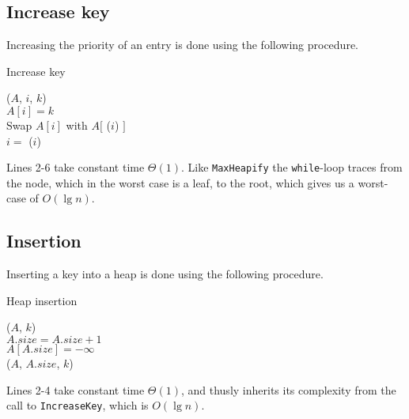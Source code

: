 \subsection{Increase key}
Increasing the priority of an entry is done using the following procedure. \\
\label{ch:heaps|sec:procedures|sub:increase-key}
\begin{algorithm}[H]
	\caption{Increase key}
	\label{alg:heap-increase-key}





	\BlankLine
	\IncreaseKey($A$, $i$, $k$) \\
	\Begin
	{
		$A[i] = k$ \\
		{
			Swap $A[i]$ with $A[$ \Parent($i$) $]$ \\
			$i = $ \Parent($i$)
		}
	}
\end{algorithm}
Lines 2-6 take constant time $\Theta(1)$. Like \texttt{MaxHeapify} the
\texttt{while}-loop traces from the node, which in the worst case is a leaf,
to the root, which gives us a worst-case of $O(\lg n)$.

\subsection{Insertion}
Inserting a key into a heap is done using the following procedure. \\
\label{ch:heaps|sec:procedures|sub:insertion}
\begin{algorithm}[H]
	\caption{Heap insertion}
	\label{alg:heap-insert}




	\BlankLine
	\Insert($A$, $k$) \\
	\Begin
	{
		$A.size = A.size + 1$ \\
		$A[A.size] = -\infty$ \\
		\IncreaseKey($A$, $A.size$, $k$)
	}
\end{algorithm}
Lines 2-4 take constant time $\Theta(1)$, and thusly inherits its complexity
from the call to \texttt{IncreaseKey}, which is $O(\lg n)$.

